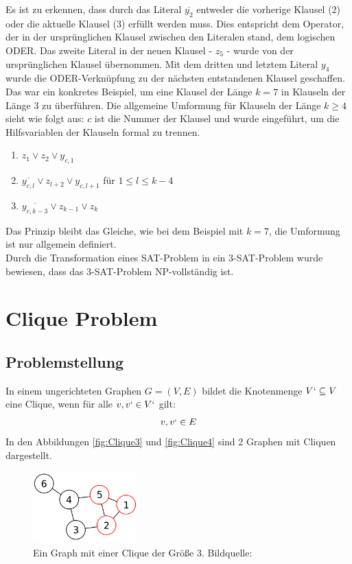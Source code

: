 \documentclass[ngerman]{article}
\begin{document}
Es ist zu erkennen, dass durch das Literal $\overline{y_2}$ entweder die vorherige Klausel (2) oder die aktuelle Klausel (3) erfüllt werden muss.
Dies entspricht dem Operator, der in der ursprünglichen Klausel zwischen den Literalen stand, dem logischen ODER.
Das zweite Literal in der neuen Klausel - $z_5$ - wurde von der ursprünglichen Klausel übernommen.
Mit dem dritten und letztem Literal $y_4$ wurde die ODER-Verknüpfung zu der nächsten entstandenen Klausel geschaffen.\\
Das war ein konkretes Beispiel, um eine Klausel der Länge $k=7$ in Klauseln der Länge 3 zu überführen.
Die allgemeine Umformung für Klauseln der Länge $k\ge4$ sieht wie folgt aus:
$c$ ist die Nummer der Klausel und wurde eingeführt, um die Hilfsvariablen der Klauseln formal zu trennen.
\begin{enumerate}
\item $z_1 \vee z_2 \vee y_{c,1}$
\item $\overline{y_{c,l}} \vee z_{l+2} \vee y_{c,l+1}$ für $1 \le l \le k - 4$
\item $\overline{y_{c,k-3}} \vee z_{k-1} \vee z_k$
\end{enumerate}
Das Prinzip bleibt das Gleiche, wie bei dem Beispiel mit $k=7$, die Umformung ist nur allgemein definiert.\\
Durch die Transformation eines SAT-Problem in ein 3-SAT-Problem wurde bewiesen, dass das 3-SAT-Problem NP-vollständig ist.

\section{Clique Problem}
\subsection{Problemstellung}
In einem ungerichteten Graphen $G = (V,E)$ bildet die Knotenmenge $V` \subseteq V$ eine Clique, wenn für alle $v, v` \in V`$ gilt: $${v,v`} \in E$$
In den Abbildungen \vref{fig:Clique3} und \vref{fig:Clique4} sind 2 Graphen mit Cliquen dargestellt.

\begin{figure}[H]
	\centering
	\includegraphics[width=4cm]{figures/clique1.png}
	\caption[Ein Graph mit einer Clique der Größe 3]{Ein Graph mit einer Clique der Größe 3. Bildquelle: \cite{cliqueImage1}}
	\label{fig:Clique3}
\end{figure}
\end{document}
